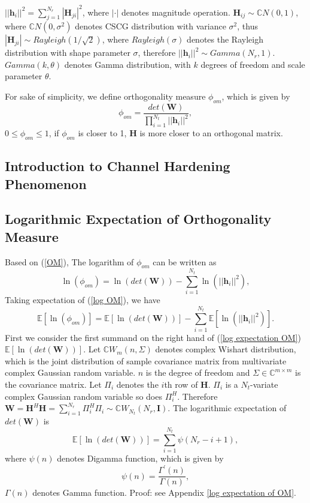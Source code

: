 \documentclass[12pt, draftclsnofoot, onecolumn]{IEEEtran}
\begin{document}
$||\mathbf{h}_{i}||^{2}=\sum_{j=1}^{N_{r}}|\mathbf{H}_{ji}|^{2}$, where $|\cdot|$ denotes magnitude operation. $\mathbf{H}_{ij}\sim \mathbb{C}N(0,1)$, where $\mathbb{C}N(0, \sigma^{2})$ denotes CSCG distribution with variance $\sigma^{2}$, thus $|\mathbf{H}_{ji}|\sim Rayleigh(1/\sqrt{2})$, where $Rayleigh(\sigma)$ denotes the Rayleigh distribution with shape parameter $\sigma$, therefore $||\mathbf{h}_{i}||^{2}\sim Gamma(N_{r},1)$\cite{papoulis2002probability}. $Gamma(k,\theta)$ denotes Gamma distribution, with $k$ degrees of freedom and scale parameter $\theta$.

For sake of simplicity, we define orthogonality measure $\phi_{om}$, which is given by 
\begin{equation}
\phi_{om}=\frac{det(\mathbf{W})}{\prod_{i=1}^{N_{t}}||\mathbf{h}_{i}||^{2}},
\label{OM}
\end{equation}
$0\leq \phi_{om}\leq 1$, if $\phi_{om}$ is closer to 1, $\mathbf{H}$ is more closer to an orthogonal matrix. 
\subsection{Introduction to Channel Hardening Phenomenon}
\subsection{Logarithmic Expectation of Orthogonality Measure}
Based on (\ref{OM}), The logarithm of $\phi_{om}$ can be written as 
\begin{equation}
\ln(\phi_{om})=\ln(det(\mathbf{W}))-\sum_{i=1}^{N_{t}}\ln(||\mathbf{h}_{i}||^{2}),
\label{log OM}
\end{equation}
Taking expectation of (\ref{log OM}), we have 
\begin{equation}
\mathbb{E}[\ln(\phi_{om})]=\mathbb{E}[\ln(det(\mathbf{W}))]-\sum_{i=1}^{N_{t}}\mathbb{E}[\ln(||\mathbf{h}_{i}||^{2})].
\label{log expectation OM}
\end{equation}
First we consider the first summand on the right hand of (\ref{log expectation OM}) $\mathbb{E}[\ln(det(\mathbf{W}))]$. Let $\mathbb{C}W_{m}(n, \Sigma)$ denotes complex Wishart distribution, which is the joint distribution of sample covariance matrix from multivariate complex Gaussian random variable\cite{goodman1963statistical}. $n$ is the degree of freedom and $\Sigma\in \mathbb{C}^{m\times m}$ is the covariance matrix. Let $\Pi_{i}$ denotes the $i$th row of $\mathbf{H}$. $\Pi_{i}$ is a $N_{t}$-variate complex Gaussian random variable so does $\Pi_{i}^{H}$. Therefore $\mathbf{W}=\mathbf{H}^{H}\mathbf{H}=\sum_{i=1}^{N_{r}}\Pi_{i}^{H}\Pi_{i}\sim \mathbb{C}W_{N_{t}}(N_{r}, \mathbf{I})$. The logarithmic expectation of $det(\mathbf{W})$ is
\begin{equation}
\mathbb{E}[\ln(det(\mathbf{W}))]=\sum_{i=1}^{N_{t}}\psi(N_{r}-i+1),
\label{log expectation of wishart}
\end{equation}
where $\psi(n)$ denotes Digamma function, which is given by\cite{papoulis2002probability}
\begin{equation}
\psi(n)=\frac{\Gamma^{'}(n)}{\Gamma(n)},
\label{Digmma function}
\end{equation}
$\Gamma(n)$ denotes Gamma function.
Proof: see Appendix \ref{log expectation of OM}.
\end{document}
